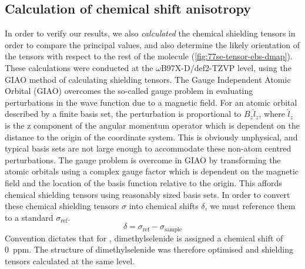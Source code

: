 \begin{refsection}
\subsection{Calculation of chemical shift anisotropy}
In order to verify our results, we also \emph{calculated} the chemical shielding tensors in order to compare the principal values, and also determine the likely orientation of the tensors with respect to the rest of the molecule (\cref{fig:77se-tensor-ebs-dmap}).
These calculations were conducted at the $ \omega $B97X-D/def2-TZVP level, using the GIAO method of calculating shielding tensors.\autocite{Schreckenbach1995CalculationTheory,Schreckenbach1996TheApproximation}
The Gauge Independent Atomic Orbital (GIAO) overcomes the so-called gauge problem in evaluating perturbations in the wave function due to a magnetic field.
For an atomic orbital described by a finite basis set, the perturbation is proportional to $B_{z}\hat{l}_{z}$, where $\hat{l}_{z}$ is the z component of the angular momentum operator which is dependent on the distance to the origin of the coordinate system.
This is obviously unphysical, and typical basis sets are not large enough to accommodate these non-atom centred perturbations.
The gauge problem is overcome in GIAO by transforming the atomic orbitals using a complex gauge factor which is dependent on the magnetic field and the location of the basis function relative to the origin.
This affords chemical shielding tensors using reasonably sized basis sets.
In order to convert these chemical shielding tensors $ \sigma $ into chemical shifts $ \delta $, we must reference them to a standard $\sigma_{\textrm{ref}}$.
\begin{equation}
  \delta = \sigma_{\textrm{ref}} - \sigma_{\textrm{sample}}
  \label{eqn:shieldingtoshift}
\end{equation}
Convention dictates that for , dimethylselenide is assigned a chemical shift of 0~ppm.
The structure of dimethylselenide was therefore optimised and shielding tensors calculated at the same level.


\end{refsection}
